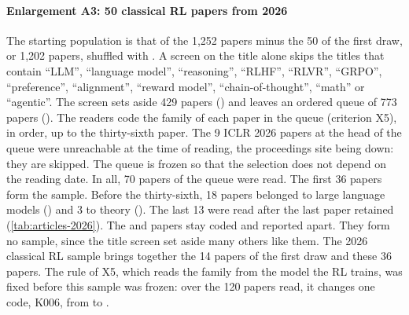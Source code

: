 \paragraph{Enlargement A3: 50 classical RL papers from 2026}
The starting population is that of the 1,252 papers minus the 50 of the first draw, or 1,202
papers, shuffled with . A screen on the title alone
skips the titles that contain \enquote{LLM}, \enquote{language model}, \enquote{reasoning},
\enquote{RLHF}, \enquote{RLVR}, \enquote{GRPO}, \enquote{preference}, \enquote{alignment},
\enquote{reward model}, \enquote{chain-of-thought}, \enquote{math} or \enquote{agentic}. The screen
sets aside 429 papers () and leaves an ordered queue of
773 papers (). The readers code the family of each paper in the
queue (criterion X5), in order, up to the thirty-sixth  paper. The 9 ICLR 2026 papers at
the head of the queue were unreachable at the time of reading, the proceedings site being down: they are
skipped. The queue is frozen so that the selection does not depend on the reading date.
In all, 70 papers of the queue were read. The first 36  papers form the sample. Before
the thirty-sixth, 18 papers belonged to large language models () and 3 to theory
(). The last 13 were read after the last paper retained (\cref{tab:articles-2026}). The
 and  papers stay coded and reported apart. They form no sample, since the
title screen set aside many others like them. The 2026 classical RL sample brings together the 14
 papers of the first draw and these 36 papers. The rule of X5, which reads the family
from the model the RL trains, was fixed before this sample was frozen: over the 120 papers read, it
changes one code, K006, from  to .


